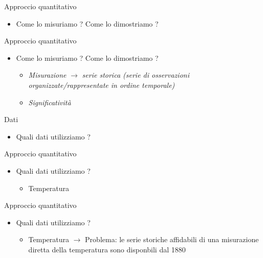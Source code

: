 \documentclass{beamer}
\begin{document}
\begin{frame}{Approccio quantitativo}
\begin{itemize}
\item Come lo misuriamo ? Come lo dimostriamo ? 
\end{itemize}
\end{frame}

\begin{frame}{Approccio quantitativo}
\begin{itemize}
\item Come lo misuriamo ? Come lo dimostriamo ? 
\begin{itemize}
\item \textit{Misurazione} $\rightarrow$ \textit{serie storica (serie di osservazioni organizzate/rappresentate in ordine temporale)}
\item \textit{Significatività }
\end{itemize}
\end{itemize}
\end{frame}


\begin{frame}{Dati}
\begin{itemize}
\item Quali dati utilizziamo ?
\end{itemize}
\end{frame}

\begin{frame}{Approccio quantitativo}
\begin{itemize}
\item Quali dati utilizziamo ? 
\begin{itemize}
\item Temperatura 
\end{itemize}
\end{itemize}
\end{frame}


\begin{frame}{Approccio quantitativo}
\begin{itemize}
\item Quali dati utilizziamo ? 
\begin{itemize}
\item Temperatura  $\rightarrow$ Problema: le serie storiche affidabili di una misurazione diretta della temperatura sono disponbili dal 1880 \cite{1880}
\end{itemize}
\end{itemize}
\end{frame}
\end{document}
